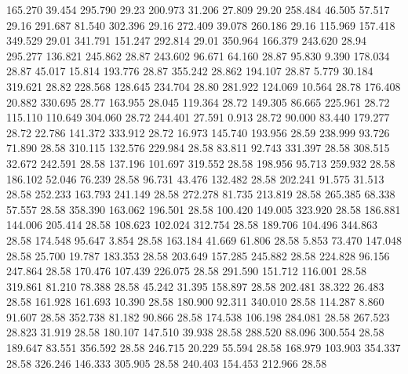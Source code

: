  165.270   39.454  295.790        29.23
 200.973   31.206   27.809        29.20
 258.484   46.505   57.517        29.16
 291.687   81.540  302.396        29.16
 272.409   39.078  260.186        29.16
 115.969  157.418  349.529        29.01
 341.791  151.247  292.814        29.01
 350.964  166.379  243.620        28.94
 295.277  136.821  245.862        28.87
 243.602   96.671   64.160        28.87
  95.830    9.390  178.034        28.87
  45.017   15.814  193.776        28.87
 355.242   28.862  194.107        28.87
   5.779   30.184  319.621        28.82
 228.568  128.645  234.704        28.80
 281.922  124.069   10.564        28.78
 176.408   20.882  330.695        28.77
 163.955   28.045  119.364        28.72
 149.305   86.665  225.961        28.72
 115.110  110.649  304.060        28.72
 244.401   27.591    0.913        28.72
  90.000   83.440  179.277        28.72
  22.786  141.372  333.912        28.72
  16.973  145.740  193.956        28.59
 238.999   93.726   71.890        28.58
 310.115  132.576  229.984        28.58
  83.811   92.743  331.397        28.58
 308.515   32.672  242.591        28.58
 137.196  101.697  319.552        28.58
 198.956   95.713  259.932        28.58
 186.102   52.046   76.239        28.58
  96.731   43.476  132.482        28.58
 202.241   91.575   31.513        28.58
 252.233  163.793  241.149        28.58
 272.278   81.735  213.819        28.58
 265.385   68.338   57.557        28.58
 358.390  163.062  196.501        28.58
 100.420  149.005  323.920        28.58
 186.881  144.006  205.414        28.58
 108.623  102.024  312.754        28.58
 189.706  104.496  344.863        28.58
 174.548   95.647    3.854        28.58
 163.184   41.669   61.806        28.58
   5.853   73.470  147.048        28.58
  25.700   19.787  183.353        28.58
 203.649  157.285  245.882        28.58
 224.828   96.156  247.864        28.58
 170.476  107.439  226.075        28.58
 291.590  151.712  116.001        28.58
 319.861   81.210   78.388        28.58
  45.242   31.395  158.897        28.58
 202.481   38.322   26.483        28.58
 161.928  161.693   10.390        28.58
 180.900   92.311  340.010        28.58
 114.287    8.860   91.607        28.58
 352.738   81.182   90.866        28.58
 174.538  106.198  284.081        28.58
 267.523   28.823   31.919        28.58
 180.107  147.510   39.938        28.58
 288.520   88.096  300.554        28.58
 189.647   83.551  356.592        28.58
 246.715   20.229   55.594        28.58
 168.979  103.903  354.337        28.58
 326.246  146.333  305.905        28.58
 240.403  154.453  212.966        28.58
